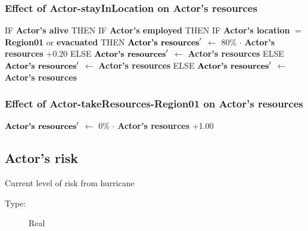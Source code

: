 \documentclass{article}%
\begin{document}
%
\subsubsection{Effect of Actor{-}stayInLocation on Actor's resources}%
\label{ssubsec:Effect of Actor{-}stayInLocation on Actor's resources}%
\begin{flushleft}%
IF %
\textbf{Actor's alive}%
\linebreak%
\hspace*{2em}%
THEN %
IF %
\textbf{Actor's employed}%
\linebreak%
\hspace*{4em}%
THEN %
IF %
\textbf{Actor's location}%
$=$%
\textbf{Region01}%
 or %
\textbf{evacuated}%
\linebreak%
\hspace*{6em}%
THEN %
$\mbox{\textbf{Actor's resources}} '$%
$\leftarrow$%
80\%%
$\cdot$%
\textbf{Actor's resources}%
+0.20%
\linebreak%
\hspace*{6em}%
ELSE %
$\mbox{\textbf{Actor's resources}} '$%
$\leftarrow$%
\textbf{Actor's resources}%
\linebreak%
\hspace*{4em}%
ELSE %
$\mbox{\textbf{Actor's resources}} '$%
$\leftarrow$%
\textbf{Actor's resources}%
\linebreak%
\hspace*{2em}%
ELSE %
$\mbox{\textbf{Actor's resources}} '$%
$\leftarrow$%
\textbf{Actor's resources}%
\end{flushleft}

%
\subsubsection{Effect of Actor{-}takeResources{-}Region01 on Actor's resources}%
\label{ssubsec:Effect of Actor{-}takeResources{-}Region01 on Actor's resources}%
\begin{flushleft}%
$\mbox{\textbf{Actor's resources}} '$%
$\leftarrow$%
0\%%
$\cdot$%
\textbf{Actor's resources}%
+1.00%
\end{flushleft}

%
\subsection{Actor's risk}%
\label{subsec:Actor's risk}%
Current level of risk from hurricane%
\begin{description}%
\item[Type:]%
Real%
\end{description}%
\end{document}
